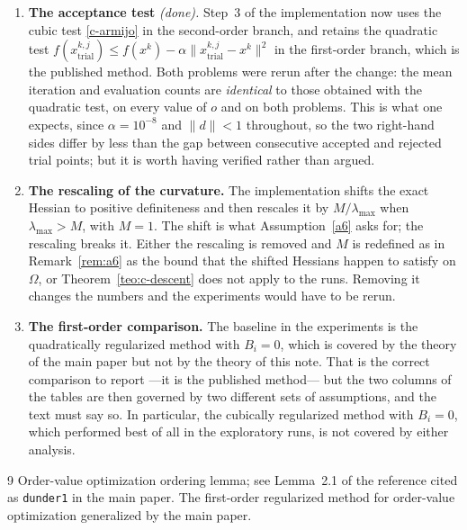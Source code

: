 \documentclass[11pt]{article}
\newcommand{\xkjtrial}{x^{k,j}_{\mathrm{trial}}}
\begin{document}
\begin{enumerate}
\item \textbf{The acceptance test} \emph{(done).} Step~3 of the implementation
now uses the cubic test \eqref{c-armijo} in the second-order branch, and retains
the quadratic test $f(\xkjtrial) \leq f(x^k) - \alpha\|\xkjtrial - x^k\|^2$ in
the first-order branch, which is the published method. Both problems were
rerun after the change: the mean iteration and evaluation counts are
\emph{identical} to those obtained with the quadratic test, on every value of
$o$ and on both problems. This is what one expects, since $\alpha = 10^{-8}$ and
$\|d\| < 1$ throughout, so the two right-hand sides differ by less than the gap
between consecutive accepted and rejected trial points; but it is worth having
verified rather than argued.

\item \textbf{The rescaling of the curvature.} The implementation shifts the
exact Hessian to positive definiteness and then rescales it by
$M/\lambda_{\max}$ when $\lambda_{\max} > M$, with $M = 1$. The shift is what
Assumption~\ref{a6} asks for; the rescaling breaks it. Either the rescaling is
removed and $M$ is redefined as in Remark~\ref{rem:a6} as the bound that the
shifted Hessians happen to satisfy on $\Omega$, or Theorem~\ref{teo:c-descent}
does not apply to the runs. Removing it changes the numbers and the experiments
would have to be rerun.

\item \textbf{The first-order comparison.} The baseline in the experiments is
the quadratically regularized method with $B_i = 0$, which is covered by the
theory of the main paper but not by the theory of this note. That is the
correct comparison to report ---it is the published method--- but the two
columns of the tables are then governed by two different sets of assumptions,
and the text must say so. In particular, the cubically regularized method with
$B_i = 0$, which performed best of all in the exploratory runs, is not covered
by either analysis.
\end{enumerate}

\begin{thebibliography}{9}
 Order-value optimization ordering lemma; see Lemma~2.1 of the
reference cited as \texttt{dunder1} in the main paper.
 The first-order regularized method for order-value
optimization generalized by the main paper.
\end{thebibliography}
\end{document}
